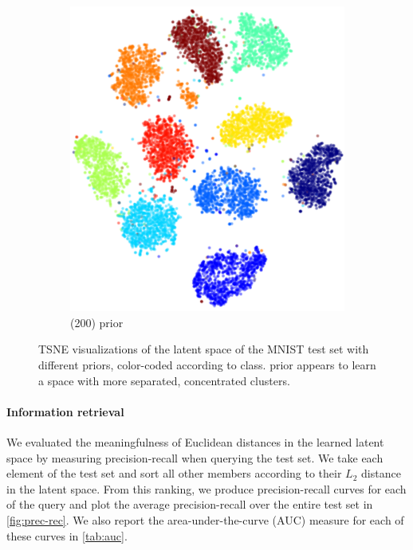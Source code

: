 \begin{figure}[H]
\begin{subfigure}[t]{0.4\textwidth}
    \includegraphics[width=\textwidth]{img/loracs/mnist/tsne/mnist2-tsne-tmc.png}
    \caption{\acronym(200) prior}
\end{subfigure}
\caption{TSNE visualizations of the latent space of the MNIST test set with different priors,
color-coded according to class. \acronym\;prior appears to learn a space with more
separated, concentrated clusters.}
\label{fig:tsne-tmc-normal}
\end{figure}

\paragraph{Information retrieval}
We evaluated the meaningfulness of Euclidean distances
in the learned latent space
by measuring precision-recall
when querying the test set.
We take each element of the test set
and sort all other members according to
their $L_2$ distance in the latent space.
From this ranking, we produce
precision-recall curves for each 
of the query and 
plot the average precision-recall
over the entire test set in \autoref{fig:prec-rec}.
We also report the area-under-the-curve (AUC)
measure for each of these curves in \autoref{tab:auc}.

